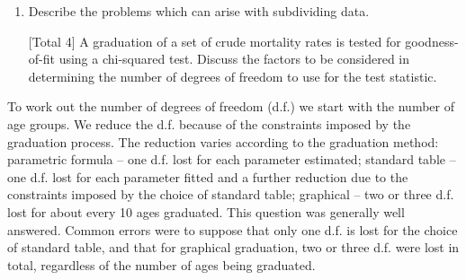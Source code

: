 \documentclass[a4paper,12pt]{article}
\begin{document}
\begin{enumerate}


\item %

Describe the problems which can arise with subdividing data.


[Total 4]
A graduation of a set of crude mortality rates is tested for goodness-of-fit using a
chi-squared test.
Discuss the factors to be considered in determining the number of degrees of freedom
to use for the test statistic.

\end{enumerate}
\newpage

To work out the number of degrees of freedom (d.f.) we start with the number of age groups.
We reduce the d.f. because of the constraints imposed by the graduation process.
The reduction varies according to the graduation method:
parametric formula – one d.f. lost for each parameter estimated;
standard table – one d.f. lost for each parameter fitted and a further reduction due to the constraints imposed by the choice of standard table;
graphical – two or three d.f. lost for about every 10 ages graduated.
This question was generally well answered. Common errors were to suppose that only one d.f. is lost for the choice of standard table, and that for graphical graduation, two or three
d.f. were lost in total, regardless of the number of ages being graduated.
\end{document}
